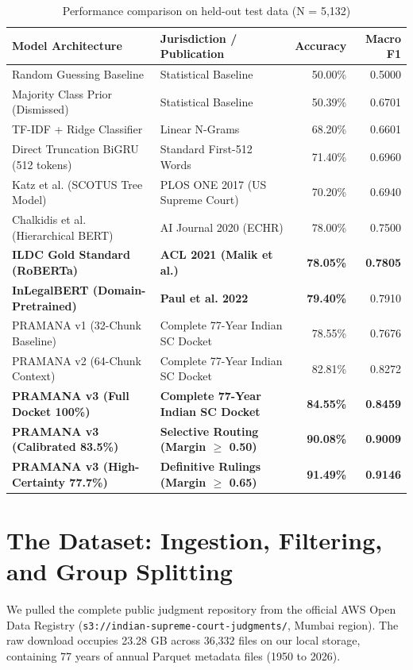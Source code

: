 \documentclass[11pt,a4paper]{article}
\begin{document}
\begin{table}[h]
\caption{Performance comparison on held-out test data (N = 5,132)}
\label{tab:benchmarks}
\centering
\begin{tabularx}{\textwidth}{llrr}
\toprule
\textbf{Model Architecture} & \textbf{Jurisdiction / Publication} & \textbf{Accuracy} & \textbf{Macro F1} \\
\midrule
Random Guessing Baseline & Statistical Baseline & 50.00\% & 0.5000 \\
Majority Class Prior (Dismissed) & Statistical Baseline & 50.39\% & 0.6701 \\
TF-IDF + Ridge Classifier & Linear N-Grams & 68.20\% & 0.6601 \\
Direct Truncation BiGRU (512 tokens) & Standard First-512 Words & 71.40\% & 0.6960 \\
Katz et al. (SCOTUS Tree Model) & PLOS ONE 2017 (US Supreme Court) & 70.20\% & 0.6940 \\
Chalkidis et al. (Hierarchical BERT) & AI Journal 2020 (ECHR) & 78.00\% & 0.7500 \\
\midrule
\textbf{ILDC Gold Standard (RoBERTa)} & \textbf{ACL 2021 (Malik et al.)} & \textbf{78.05\%} & \textbf{0.7805} \\
\textbf{InLegalBERT (Domain-Pretrained)} & \textbf{Paul et al. 2022} & \textbf{79.40\%} & 0.7910 \\
\midrule
PRAMANA v1 (32-Chunk Baseline) & Complete 77-Year Indian SC Docket & 78.55\% & 0.7676 \\
PRAMANA v2 (64-Chunk Context) & Complete 77-Year Indian SC Docket & 82.81\% & 0.8272 \\
\textbf{PRAMANA v3 (Full Docket 100\%)} & \textbf{Complete 77-Year Indian SC Docket} & \textbf{84.55\%} & \textbf{0.8459} \\
\textbf{PRAMANA v3 (Calibrated 83.5\%)} & \textbf{Selective Routing (Margin $\ge$ 0.50)} & \textbf{90.08\%} & \textbf{0.9009} \\
\textbf{PRAMANA v3 (High-Certainty 77.7\%)} & \textbf{Definitive Rulings (Margin $\ge$ 0.65)} & \textbf{91.49\%} & \textbf{0.9146} \\
\bottomrule
\end{tabularx}
\end{table}

\section{The Dataset: Ingestion, Filtering, and Group Splitting}
We pulled the complete public judgment repository from the official AWS Open Data Registry (\texttt{s3://indian-supreme-court-judgments/}, Mumbai region). The raw download occupies 23.28 GB across 36,332 files on our local storage, containing 77 years of annual Parquet metadata files (1950 to 2026).
\end{document}
